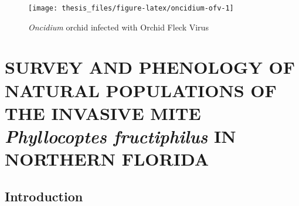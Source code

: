 \documentclass[12pt,final,CPage]{ufthesis}
\begin{document}
{\begin{figure}
  {\centering \texttt{[image: thesis\_files/figure-latex/oncidium-ofv-1]} 

  }

  \caption[\textit{Oncidium} orchid infected with Orchid Fleck Virus]{\textit{Oncidium} orchid infected with Orchid Fleck Virus}\label{fig:oncidium-ofv}
  \end{figure}
  \hypertarget{survey-pheno}{%
  \chapter{\texorpdfstring{SURVEY AND PHENOLOGY OF NATURAL POPULATIONS OF THE INVASIVE MITE \emph{Phyllocoptes fructiphilus} IN NORTHERN FLORIDA}{SURVEY AND PHENOLOGY OF NATURAL POPULATIONS OF THE INVASIVE MITE Phyllocoptes fructiphilus IN NORTHERN FLORIDA}}\label{survey-pheno}}

  \hypertarget{intro-survey-pheno}{%
  \section{Introduction}\label{intro-survey-pheno}}

}
\end{document}
